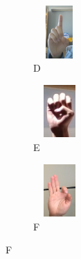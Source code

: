 \begin{figure}[H]
  \begin{subfigure}{0.1\textwidth}
    \includegraphics[width=2cm, height=2cm, keepaspectratio=false]{images/7-anexe/d_ex1.jpg}
    \caption{D}
  \end{subfigure}\hspace{1cm}
  \begin{subfigure}{0.1\textwidth}
    \includegraphics[width=2cm, height=2cm, keepaspectratio=false]{images/7-anexe/e_ex1.jpg}
    \caption{E}
  \end{subfigure}\hspace{1cm}
  \begin{subfigure}{0.1\textwidth}
    \includegraphics[width=2cm, height=2cm, keepaspectratio=false]{images/7-anexe/f_ex1.jpg}
    \caption{F}
  \end{subfigure}\hspace{1cm}

  


\end{figure}
